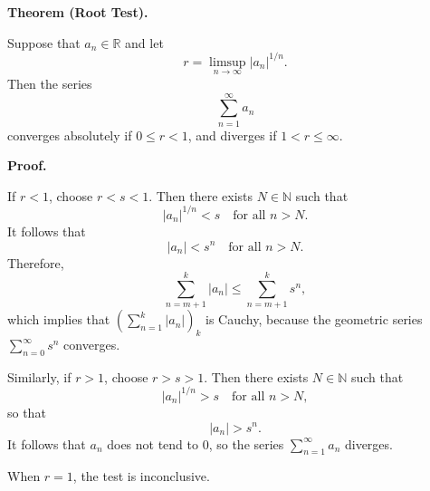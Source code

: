 \documentclass{article}
\begin{document}
\textbf{Theorem (Root Test).}

Suppose that \( a_n \in \mathbb{R} \) and let
\[
r = \limsup_{n \to \infty} |a_n|^{1/n}.
\]
Then the series
\[
\sum_{n=1}^{\infty} a_n
\]
converges absolutely if \( 0 \le r < 1 \), and diverges if \( 1 < r \le \infty \).

\textbf{Proof.}

If \( r < 1 \), choose \( r < s < 1 \).  
Then there exists \( N \in \mathbb{N} \) such that
\[
|a_n|^{1/n} < s \quad \text{for all } n > N.
\]
It follows that
\[
|a_n| < s^n \quad \text{for all } n > N.
\]
Therefore,
\[
\sum_{n=m+1}^{k} |a_n| \le \sum_{n=m+1}^{k} s^n,
\]
which implies that \( \left( \sum_{n=1}^{k} |a_n| \right)_k \) is Cauchy,  
because the geometric series \( \sum_{n=0}^{\infty} s^n \) converges.

Similarly, if \( r > 1 \), choose \( r > s > 1 \).  
Then there exists \( N \in \mathbb{N} \) such that
\[
|a_n|^{1/n} > s \quad \text{for all } n > N,
\]
so that
\[
|a_n| > s^n.
\]
It follows that \( a_n \) does not tend to 0,  
so the series \( \sum_{n=1}^{\infty} a_n \) diverges.

When \( r = 1 \), the test is inconclusive.
\end{document}
